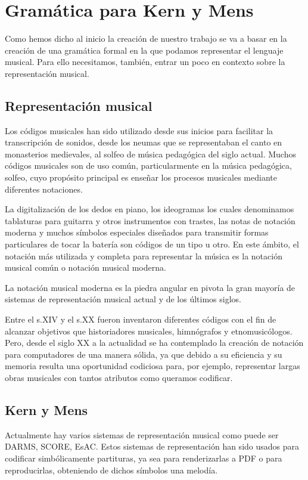 \documentclass{article}
\begin{document}
    \section{Gramática para Kern\cite{kern} y Mens\cite{mens}}
    Como hemos dicho al inicio la creación de nuestro trabajo se va a basar en la creación de una gramática formal en la
    que podamos representar el lenguaje musical. Para ello necesitamos, también, entrar un poco en contexto sobre la representación
    musical.
    \subsection{Representación musical}
    Los códigos musicales han sido utilizado desde sus inicios para facilitar la transcripción de sonidos, desde los neumas
    que se representaban el canto en monasterios medievales, al solfeo de música pedagógica del siglo actual. Muchos códigos
    musicales son de uso común, particularmente en la música pedagógica, solfeo, cuyo propósito principal es enseñar los
    procesos musicales mediante diferentes notaciones.

    La digitalización de los dedos en piano, los ideogramas los cuales denominamos tablaturas para guitarra y otros instrumentos con trastes,
    las notas de notación moderna y muchos símbolos especiales diseñados para transmitir formas particulares de tocar la batería
    son códigos de un tipo u otro. En este ámbito, el notación más utilizada y completa para representar la música
    es la notación musical común o notación musical moderna.

    La notación musical moderna es la piedra angular en pivota la gran mayoría de sistemas de representación musical actual
    y de los últimos siglos.

    Entre el s.XIV y el s.XX fueron inventaron diferentes códigos con el fin de alcanzar objetivos que historiadores musicales,
    himnógrafos y etnomusicólogos. Pero, desde el siglo XX a la actualidad se ha contemplado la creación de notación para
    computadores de una manera sólida, ya que debido a su eficiencia y su memoria resulta una oportunidad codiciosa para,
    por ejemplo, representar largas obras musicales con tantos atributos como queramos codificar.

    \subsection{Kern y Mens}

    Actualmente hay varios sistemas de representación musical como puede ser DARMS\cite{darms}, SCORE\cite{score},
    EsAC\cite{esac}. Estos sistemas de representación han sido usados para
    codificar simbólicamente partituras, ya sea para renderizarlas a PDF o para reproducirlas,
    obteniendo de dichos símbolos una melodía.
\end{document}

